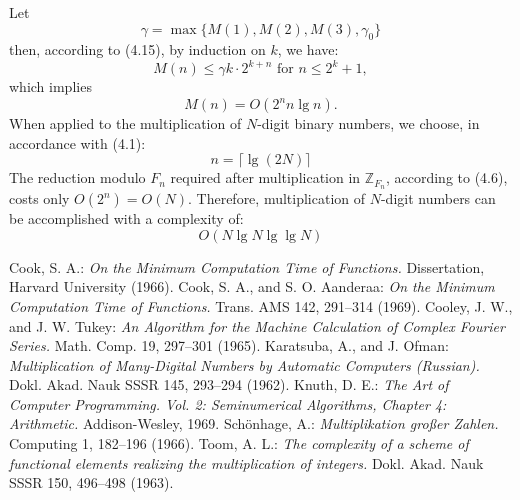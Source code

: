 \documentclass{article}
\begin{document}
Let
\[
\gamma = \max \{M(1), M(2), M(3), \gamma_0\}
\]
then, according to (4.15), by induction on $k$, we have:
\[
M(n) \le \gamma k \cdot 2^{k + n}\text{ for } n \le 2^k + 1,
\]
which implies
\[
M(n) = O(2^n n \lg n).
\]
When applied to the multiplication of $N$-digit binary numbers, we choose, in accordance with (4.1):
\[
n = \lceil \lg(2N)\rceil
\]
The reduction modulo $F_n$ required after multiplication in $\mathbb{Z}_{F_n}$, according to (4.6), costs only $O(2^n) = O(N)$. Therefore, multiplication of $N$-digit numbers can be accomplished with a complexity of:
\[
O(N \lg N \lg \lg N)
\]

\begin{thebibliography}{99}
 Cook, S. A.: \textit{On the Minimum Computation Time of Functions.} Dissertation, Harvard University (1966).
 Cook, S. A., and S. O. Aanderaa: \textit{On the Minimum Computation Time of Functions.} Trans. AMS 142, 291--314 (1969).
 Cooley, J. W., and J. W. Tukey: \textit{An Algorithm for the Machine Calculation of Complex Fourier Series.} Math. Comp. 19, 297--301 (1965).
 Karatsuba, A., and J. Ofman: \textit{Multiplication of Many-Digital Numbers by Automatic Computers (Russian).} Dokl. Akad. Nauk SSSR 145, 293--294 (1962).
 Knuth, D. E.: \textit{The Art of Computer Programming. Vol. 2: Seminumerical Algorithms, Chapter 4: Arithmetic.} Addison-Wesley, 1969.
 Schönhage, A.: \textit{Multiplikation großer Zahlen.} Computing 1, 182--196 (1966).
 Toom, A. L.: \textit{The complexity of a scheme of functional elements realizing the multiplication of integers.} Dokl. Akad. Nauk SSSR 150, 496--498 (1963).
\end{thebibliography}
\end{document}
